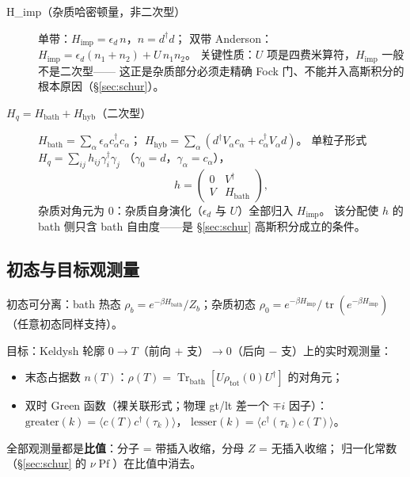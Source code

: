\documentclass[11pt,a4paper]{ctexart}
\newcommand{\Pf}{\operatorname{Pf}}
\theoremstyle{plain}
\theoremstyle{definition}
\theoremstyle{remark}
\begin{document}
\begin{description}
\item[H\_imp（杂质哈密顿量，非二次型）]
  单带：$H_{\mathrm{imp}} = \epsilon_d\, n$，$n = d^\dagger d$；
  双带 Anderson：$H_{\mathrm{imp}} = \epsilon_d(n_1+n_2) + U\,n_1 n_2$。
  关键性质：$U$ 项是四费米算符，$H_{\mathrm{imp}}$ 一般不是二次型——
  这正是杂质部分必须走精确 Fock 门、不能并入高斯积分的根本原因（\S\ref{sec:schur}）。
\item[$H_q = H_{\mathrm{bath}} + H_{\mathrm{hyb}}$（二次型）]
  $H_{\mathrm{bath}} = \sum_\alpha \epsilon_\alpha c_\alpha^\dagger c_\alpha$；
  $H_{\mathrm{hyb}} = \sum_\alpha (d^\dagger V_\alpha c_\alpha + c_\alpha^\dagger V_\alpha d)$。
  单粒子形式 $H_q = \sum_{ij} h_{ij}\gamma_i^\dagger\gamma_j$
  （$\gamma_0 = d$，$\gamma_\alpha = c_\alpha$），
  \begin{equation}
  h = \begin{pmatrix} 0 & V^\dagger \\ V & H_{\mathrm{bath}} \end{pmatrix},
  \label{eq:hmat}
  \end{equation}
  杂质对角元为 0：杂质自身演化（$\epsilon_d$ 与 $U$）全部归入 $H_{\mathrm{imp}}$。
  该分配使 $h$ 的 bath 侧只含 bath 自由度——是 \S\ref{sec:schur} 高斯积分成立的条件。
\end{description}

\subsection{初态与目标观测量}

初态可分离：bath 热态
$\rho_b = e^{-\beta H_{\mathrm{bath}}}/Z_b$；杂质初态
$\rho_0 = e^{-\beta H_{\mathrm{imp}}}/\operatorname{tr}(e^{-\beta H_{\mathrm{imp}}})$
（任意初态同样支持）。

目标：Keldysh 轮廓 $0\to T$（前向 $+$ 支）$\to 0$（后向 $-$ 支）上的实时观测量：
\begin{itemize}
\item 末态占据数 $n(T)$：$\rho(T) = \operatorname{Tr}_{\mathrm{bath}}[U\rho_{\mathrm{tot}}(0)U^\dagger]$ 的对角元；
\item 双时 Green 函数（裸关联形式；物理 gt/lt 差一个 $\mp i$ 因子）：
      $\mathrm{greater}(k) = \langle c(T)c^\dagger(\tau_k)\rangle$，
      $\mathrm{lesser}(k) = \langle c^\dagger(\tau_k)c(T)\rangle$。
\end{itemize}
全部观测量都是\textbf{比值}：分子 = 带插入收缩，分母 $Z$ = 无插入收缩；
归一化常数（\S\ref{sec:schur} 的 $\nu\Pf$）在比值中消去。
\end{document}
